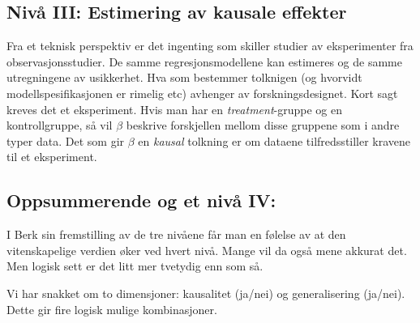 \documentclass[
  letterpaper,
  DIV=11,
  numbers=noendperiod]{scrreprt}
\begin{document}
\hypertarget{nivuxe5-iii-estimering-av-kausale-effekter}{%
\subsection{Nivå III: Estimering av kausale
effekter}\label{nivuxe5-iii-estimering-av-kausale-effekter}}

Fra et teknisk perspektiv er det ingenting som skiller studier av
eksperimenter fra observasjonsstudier. De samme regresjonsmodellene kan
estimeres og de samme utregningene av usikkerhet. Hva som bestemmer
tolknigen (og hvorvidt modellspesifikasjonen er rimelig etc) avhenger av
forskningsdesignet. Kort sagt kreves det et eksperiment. Hvis man har en
\emph{treatment}-gruppe og en kontrollgruppe, så vil \(\beta\) beskrive
forskjellen mellom disse gruppene som i andre typer data. Det som gir
\(\beta\) en \emph{kausal} tolkning er om dataene tilfredsstiller
kravene til et eksperiment.

\hypertarget{oppsummerende-og-et-nivuxe5-iv}{%
\subsection{Oppsummerende og et nivå
IV:}\label{oppsummerende-og-et-nivuxe5-iv}}

I Berk sin fremstilling av de tre nivåene får man en følelse av at den
vitenskapelige verdien øker ved hvert nivå. Mange vil da også mene
akkurat det. Men logisk sett er det litt mer tvetydig enn som så.

Vi har snakket om to dimensjoner: kausalitet (ja/nei) og generalisering
(ja/nei). Dette gir fire logisk mulige kombinasjoner.
\end{document}
